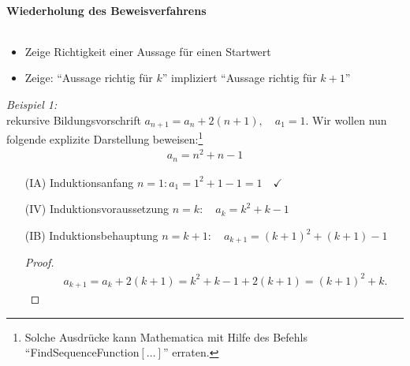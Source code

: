 
\paragraph{Wiederholung des Beweisverfahrens}$~$

\begin{itemize}
    \item Zeige Richtigkeit einer Aussage für einen Startwert 
    \item Zeige: ``Aussage richtig für $k$'' impliziert ``Aussage richtig für $k+1$''
\end{itemize}

\emph{Beispiel 1:}\\
rekursive Bildungsvorschrift $a_{n+1} = a_n + 2(n+1), \quad a_1 = 1$. Wir wollen nun folgende explizite Darstellung beweisen:\footnote{Solche Ausdrücke kann Mathematica mit Hilfe des Befehls ``FindSequenceFunction$[\hdots]$'' erraten.} 
\begin{align}
    a_n = n^2 + n-1
\end{align}
\begin{enumerate}
    \item[(IA)] Induktionsanfang $n=1: a_1 = 1^2 +1 - 1 = 1 \quad\checkmark$ 
    \item[(IV)] Induktionsvoraussetzung $n=k: \quad a_k = k^2 + k -1 $
    \item[(IB)] Induktionsbehauptung $n=k+1: \quad a_{k+1}= (k+1)^2 + (k+1) - 1$
    \begin{proof}$~$\\[-1.5cm]
        \begin{align}
            \qquad a_{k+1} = a_k + 2(k+1) = k^2 +k-1 + 2(k+1) = (k+1)^2 + k.
        \end{align}
    \end{proof}
\end{enumerate}

